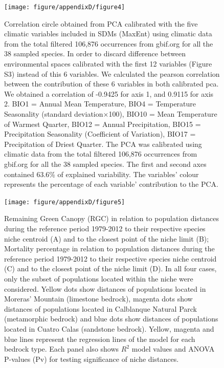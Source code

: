\documentclass[11pt,twoside]{reedthesis}
\begin{document}
\begin{figure}[hbt!]

{\centering \texttt{[image: figure/appendixD/figure4]} 

}

\caption[Correlation circle obtained from PCA calibrated with the five climatic variables used in SDMs]{Correlation circle obtained from PCA calibrated with the five climatic variables included in SDMs (MaxEnt) using climatic data from the total filtered 106,876 occurrences from gbif.org for all the 38 sampled species. In order to discard difference between environmental spaces calibrated with the first 12 variables (Figure S3) instead of this 6 variables. We calculated the pearson correlation between the contribution of these 6 variables in both calibrated pca. We obtained a correlation of -0.9425 for axis 1, and 0.9115 for axis 2. BIO1 = Annual Mean Temperature, BIO4 = Temperature Seasonality (standard deviation×100), BIO10 = Mean Temperature of Warmest Quarter, BIO12 = Annual Precipitation, BIO15 = Precipitation Seasonality (Coefficient of Variation), BIO17 = Precipitation of Driest Quarter. The PCA was calibrated using climatic data from the total filtered 106,876 occurrences from gbif.org for all the 38 sampled species. The first and second axes contained 63.6\% of explained variability. The variables' colour represents the percentage of each variable' contribution to the PCA. }\label{fig:unnamed-chunk-20}
\end{figure}\newpage
\begin{figure}[hbt!]

{\centering \texttt{[image: figure/appendixD/figure5]} 

}

\caption[Remaining Green Canopy (RGC) and mortality percentage models]{Remaining Green Canopy (RGC) in relation to population distances during the reference period 1979-2012 to their respective species niche centroid (A) and to the closest point of the niche limit (B); Mortality percentage in relation to population distances during the reference period 1979-2012 to their respective species niche centroid (C) and to the closest point of the niche limit (D). In all four cases, only the subset of populations located within the niche were considered. Yellow dots show distances of populations located in Moreras’ Mountain (limestone bedrock), magenta dots show distances of populations located in Calblanque Natural Parck (metamorphic bedrock) and blue dots show distances of populations located in Cuatro Calas (sandstone bedrock). Yellow, magenta and blue lines represent the regression lines of the model for each bedrock type. Each panel also shows $R^2$ model values and ANOVA P-values (Pv) for testing significance of niche distances.}\label{fig:unnamed-chunk-21}
\end{figure}\newpage
\end{document}
